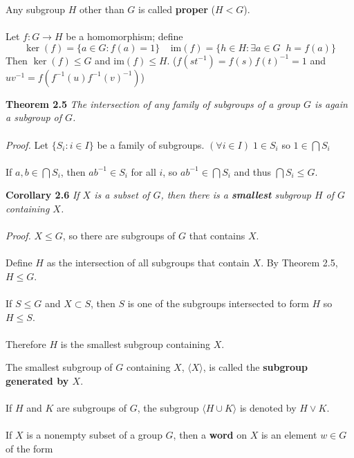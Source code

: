 \documentclass{article}
\begin{document}
Any subgroup \(H\) other than \(G\) is called \textbf{proper} (\(H<G\)).\\\\
Let \(f:G\to H\) be a homomorphism; define
\[\ker(f)=\{a\in G: f(a)=1\}\;\;\;\;\mathrm{im}(f)=\{h\in H: \exists a\in G\;\;h=f(a)\}\]
Then \(\ker(f)\le G\) and \(\mathrm{im}(f)\le H\). (\(f(st^{-1})=f(s)f(t)^{-1}=1\) and \(uv^{-1}=f(f^{-1}(u)f^{-1}(v)^{-1})\))
\begin{redrules}\color{red}
\textbf{Theorem 2.5} \textit{The intersection of any family of subgroups of a group \(G\) is again a subgroup of \(G\).}\\\\\color{black}
\textit{Proof.} Let \(\{S_{i}: i\in I\}\) be a family of subgroups. \((\forall i\in I)\;1\in S_{i}\) so \(1\in \bigcap S_{i}\)\\\\
If \(a,b\in\bigcap S_{i}\), then \(ab^{-1}\in S_{i}\) for all \(i\), so \(ab^{-1}\in\bigcap S_{i}\) and thus \(\bigcap S_{i}\le G\).
\end{redrules}
\begin{greenrules}\color{OliveGreen}
\textbf{Corollary 2.6} \textit{If \(X\) is a subset of \(G\), then there is a \textbf{smallest} subgroup \(H\) of \(G\) containing \(X\).}\\\\\color{black}
\textit{Proof.} \(X\le G\), so there are subgroups of \(G\) that contains \(X\).\\\\
Define \(H\) as the intersection of all subgroups that contain \(X\).
By \color{gray}Theorem 2.5\color{black}, \(H\le G\).\\\\
If \(S\le G\) and \(X\subset S\), then \(S\) is one of the subgroups intersected to form \(H\) so \(H\le S\).\\\\
Therefore \(H\) is the smallest subgroup containing \(X\).
\end{greenrules}
The smallest subgroup of \(G\) containing \(X\), \(\langle X\rangle\), is called the 
\textbf{subgroup generated by \(X\)}.\\\\
If \(H\) and \(K\) are subgroups of \(G\), the subgroup \(\langle H\cup K\rangle\) is denoted by \(H\lor K\).\\\\
If \(X\) is a nonempty subset of a group \(G\), then a \textbf{word} on \(X\) is an element \(w\in G\) of the form\\\\
\end{document}
